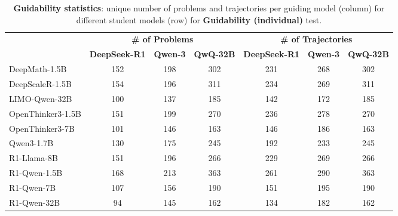 \documentclass{article} %
\begin{document}
\begin{table}[ht!]
\centering
\small
\begin{tabular}{l|ccc|ccc}
\toprule
 & \multicolumn{3}{c|}{\textbf{\# of Problems}} & \multicolumn{3}{c}{\textbf{\# of Trajectories}} \\
 & \textbf{DeepSeek-R1} & \textbf{Qwen-3} & \textbf{QwQ-32B} & \textbf{DeepSeek-R1} & \textbf{Qwen-3} & \textbf{QwQ-32B} \\
\midrule
DeepMath-1.5B          & 152 & 198 & 302 & 231 & 268 & 302 \\
DeepScaleR-1.5B        & 154 & 196 & 311 & 234 & 269 & 311 \\
LIMO-Qwen-32B          & 100 & 137 & 185 & 142 & 172 & 185 \\
OpenThinker3-1.5B      & 151 & 199 & 270 & 236 & 278 & 270 \\
OpenThinker3-7B        & 101 & 146 & 163 & 146 & 186 & 163 \\
Qwen3-1.7B             & 130 & 175 & 245 & 192 & 233 & 245 \\
\midrule
R1-Llama-8B    & 151 & 196 & 266 & 229 & 269 & 266 \\
R1-Qwen-1.5B   & 168 & 213 & 363 & 261 & 290 & 363 \\
R1-Qwen-7B     & 107 & 156 & 190 & 151 & 195 & 190 \\
R1-Qwen-32B    &  94 & 145 & 162 & 134 & 182 & 162 \\
\bottomrule
\end{tabular}
\caption{\textbf{Guidability statistics}: unique number of problems and trajectories per guiding model (column) for different student models (row) for \textbf{Guidability (individual)} test.}
\label{tab:guidability_support_statistics}
\end{table}
\end{document}
